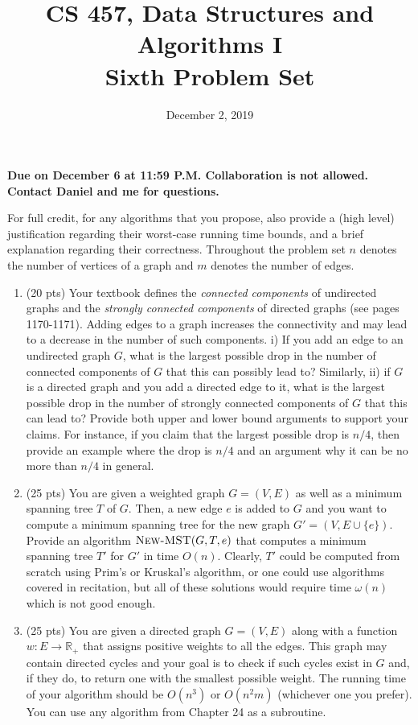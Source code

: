 \documentclass{article}
\begin{document}
\title{CS 457, Data Structures and Algorithms I\\
Sixth Problem Set}
\date{December 2, 2019}
\maketitle
\begin{center}
\textbf{Due on December 6 at 11:59 P.M. Collaboration is not allowed. Contact Daniel and me for questions.}
\end{center}

For full credit, for any algorithms that you propose, also provide a (high level) justification regarding their worst-case running time bounds, and a brief explanation regarding their correctness. Throughout the problem set $n$ denotes the number of vertices of a graph and $m$ denotes the number of edges.
\begin{enumerate}

\item (20 pts) Your textbook defines the \emph{connected components} of undirected graphs and the \emph{strongly connected components} of directed graphs (see pages 1170-1171). Adding edges to a graph increases the connectivity and may lead to a decrease in the number of such components. i) If you add an edge to an undirected graph $G$, what is the largest possible drop in the number of connected components of $G$ that this can possibly lead to? Similarly, ii) if $G$ is a directed graph and you add a directed edge to it, what is the largest possible drop in the number of strongly connected components of $G$ that this can lead to? Provide both upper and lower bound arguments to support your claims. For instance, if you claim that the largest possible drop is $n/4$, then provide an example where the drop is $n/4$ and an argument why it can be no more than $n/4$ in general. 


\item (25 pts) You are given a weighted graph $G=(V, E)$ as well as a minimum spanning tree $T$ of $G$. Then, a new edge $e$ is added to $G$ and you want to compute a minimum spanning tree for the new graph $G'=(V, E\cup\{e\})$. Provide an algorithm $\textsc{New-MST}(G,T,e)$ that computes a minimum spanning tree $T'$ for $G'$ in time $O(n)$. Clearly, $T'$ could be computed from scratch using Prim's or Kruskal's algorithm, or one could use algorithms covered in recitation, but all of these solutions would require time $\omega(n)$ which is not good enough.

\item (25 pts) You are given a directed graph $G=(V,E)$ along with a function $w:E\to \mathbb{R_+}$ that assigns positive weights to all the edges. This graph may contain directed cycles and your goal is to check if such cycles exist in $G$ and, if they do, to return one with the smallest possible weight. The running time of your algorithm should be $O(n^3)$ or $O(n^2m)$ (whichever one you prefer). You can use any algorithm from Chapter 24 as a subroutine.


\end{enumerate}
\end{document}
